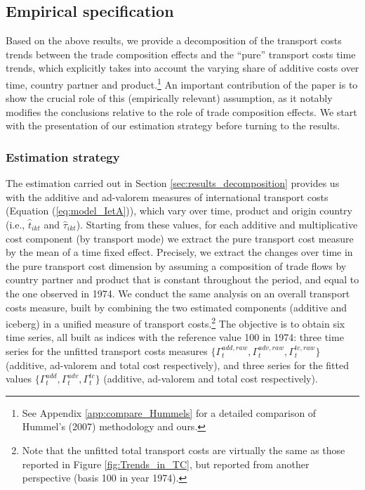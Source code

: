 \documentclass[a4paper,11pt]{article}
\begin{document}
\subsection{Empirical specification}

Based on the above results, we provide a decomposition of the transport costs trends between the trade composition effects and the ``pure'' transport costs time trends, which explicitly takes into account the varying share of additive costs over time, country partner and product.\footnote{See Appendix \ref{app:compare_Hummels} for a detailed comparison of Hummel's (2007) methodology and ours.} An important contribution of the paper is to show the crucial role of this (empirically relevant) assumption, as it notably modifies the conclusions relative to the role of trade composition effects.
We start with the presentation of our estimation strategy before turning to the results.\smallskip

\subsubsection{Estimation strategy}

The estimation carried out in Section \ref{sec:results_decomposition} provides us with the additive and ad-valorem measures of international transport costs (Equation (\ref{eq:model_IetA})), which vary over time, product and origin country (i.e., $\widehat{t}_{ikt}$ and $\widehat{\tau}_{ikt}$).
Starting from these values, for each additive and multiplicative cost component (by transport mode) we extract the pure transport cost measure by the mean of a time fixed effect.
Precisely, we extract the changes over time in the pure transport cost dimension by assuming a composition of trade flows by country partner and product that is constant throughout the period, and equal to the one observed in 1974.
We conduct the same analysis on an overall transport costs measure, built by combining the two estimated components (additive and iceberg) in a unified measure of transport costs.\footnote{Note that the unfitted total transport costs are virtually the same as those reported in Figure \ref{fig:Trends_in_TC}, but reported from another perspective (basis 100 in year 1974).} The objective is to obtain six time series, all built as indices with the reference value 100 in 1974: three time series for the unfitted transport costs measures $\{\Gamma^{add, raw}_t, \Gamma^{adv, raw}_t, \Gamma^{tc, raw}_t \}$  (additive, ad-valorem and total cost respectively), and three series for the fitted values $\{\Gamma^{add}_t, \Gamma^{adv}_t, \Gamma^{tc}_t \}$ (additive, ad-valorem and total cost respectively).
\end{document}
